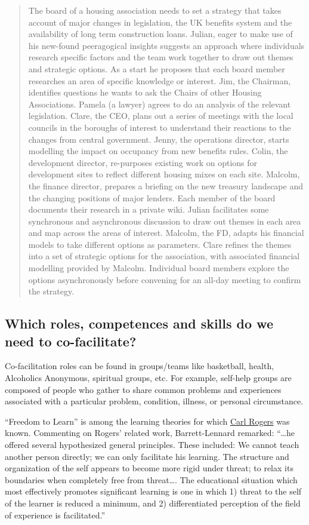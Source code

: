 \newpage
\begin{quote}
The board of a housing association needs to set a strategy that takes
account of major changes in legislation, the UK benefits system and the
availability of long term construction loans. Julian, eager to make use
of his new-found peeragogical insights suggests an approach where
individuals research specific factors and the team work together to draw
out themes and strategic options. As a start he proposes that each board
member researches an area of specific knowledge or interest. Jim, the
Chairman, identifies questions he wants to ask the Chairs of other
Housing Associations. Pamela (a lawyer) agrees to do an analysis of the
relevant legislation. Clare, the CEO, plans out a series of meetings
with the local councils in the boroughs of interest to understand their
reactions to the changes from central government. Jenny, the operations
director, starts modelling the impact on occupancy from new benefits
rules. Colin, the development director, re-purposes existing work on
options for development sites to reflect different housing mixes on each
site. Malcolm, the finance director, prepares a briefing on the new
treasury landscape and the changing positions of major lenders. Each
member of the board documents their research in a private wiki. Julian
facilitates some synchronous and asynchronous discussion to draw out
themes in each area and map across the areas of interest. Malcolm, the
FD, adapts his financial models to take different options as parameters.
Clare refines the themes into a set of strategic options for the
association, with associated financial modelling provided by Malcolm.
Individual board members explore the options asynchronously before
convening for an all-day meeting to confirm the strategy.
\end{quote}
\subsection{Which roles, competences and skills do we need to
co-facilitate?}

Co-facilitation roles can be found in groups/teams like basketball,
health, Alcoholics Anonymous, spiritual groups, etc. For example,
self-help groups are composed of people who gather to share common
problems and experiences associated with a particular problem,
condition, illness, or personal circumstance.

``Freedom to Learn'' is among the learning theories for which
\href{http://peeragogy.org/resources/literature-review-peeragogy/}{Carl
Rogers} was known. Commenting on Rogers' related work, Barrett-Lennard
remarked: ``\ldots{}he offered several hypothesized general principles.
These included: We cannot teach another person directly; we can only
facilitate his learning. The structure and organization of the self
appears to become more rigid under threat; to relax its boundaries when
completely free from threat\ldots{}. The educational situation which
most effectively promotes significant learning is one in which 1) threat
to the self of the learner is reduced a minimum, and 2) differentiated
perception of the field of experience is facilitated.''


